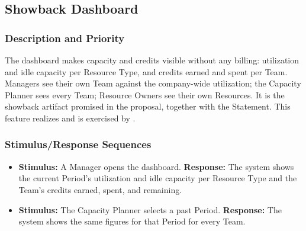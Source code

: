 \subsection{Showback Dashboard}\label{feat:dashboard}

\subsubsection{Description and Priority}
The dashboard makes capacity and credits visible without any billing: utilization and idle capacity per Resource Type, and credits earned and spent per Team. Managers see their own Team against the company-wide utilization; the Capacity Planner sees every Team; Resource Owners see their own Resources. It is the showback artifact promised in the proposal, together with the Statement. This feature realizes  and is exercised by . 

\subsubsection{Stimulus/Response Sequences}
\begin{itemize}
  \item \textbf{Stimulus:} A Manager opens the dashboard. \textbf{Response:} The system shows the current Period's utilization and idle capacity per Resource Type and the Team's credits earned, spent, and remaining.
  \item \textbf{Stimulus:} The Capacity Planner selects a past Period. \textbf{Response:} The system shows the same figures for that Period for every Team.
\end{itemize}

